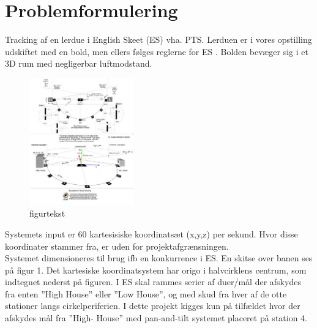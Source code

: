 \section{Problemformulering}
Tracking af en lerdue i English Skeet (ES) vha. PTS. 
Lerduen er i vores opstilling udskiftet med en bold, men ellers følges reglerne for ES
. 
Bolden bevæger sig i et 3D rum med negligerbar luftmodstand. \\

\begin{figure}[th!]
\centering
\includegraphics[width=0.4\textwidth]{./graphics/skeet-diagram_med_akser}
\caption[tekst i indholdsfortegnelsen]{figurtekst}
\label{fig:}
\end{figure}	
Systemets input er 60 kartesisiske koordinatsæt (x,y,z) per sekund. Hvor disse 
koordinater stammer fra, er uden for projektafgrænsningen. \\

Systemet dimensioneres til brug ifb en konkurrence i ES. En skitse over 
banen ses på figur 1. Det kartesiske koordinatsystem har origo i halvcirklens centrum, 
som indtegnet 
nederst på figuren. I ES skal rammes serier af duer/mål der afskydes fra 
enten ”High House” eller ”Low House”, og med skud fra hver af de otte stationer langs 
cirkelperiferien. I dette projekt kigges kun på tilfældet hvor der afskydes mål fra ”High-
House” med pan-and-tilt systemet placeret på station 4.\\

